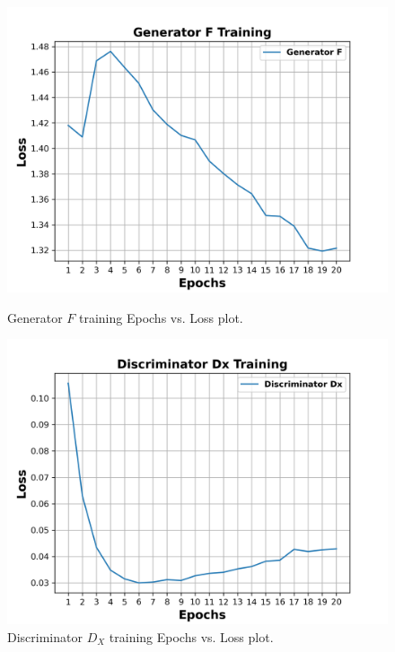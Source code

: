 \begin{figure}[H]
  \centering
  \begin{minipage}[b]{0.49\textwidth}
    \includegraphics[width=\textwidth]{images/Evaluation/GeneratorFTraining.png}
    \caption[Generator $F$ training epochs vs loss plot.]{Generator $F$ training Epochs vs. Loss plot.}
    \label{fig:generatorF}
  \end{minipage}
  \hfill
  \begin{minipage}[b]{0.49\textwidth}
    \includegraphics[width=\textwidth]{images/Evaluation/DiscriminatorDxTraining.png}
    \caption[Discriminator $D_X$ training Epochs vs. Loss plot.]{Discriminator $D_X$ training Epochs vs. Loss plot.}
    \label{fig:discriminatorDx}
  \end{minipage}
\end{figure}



